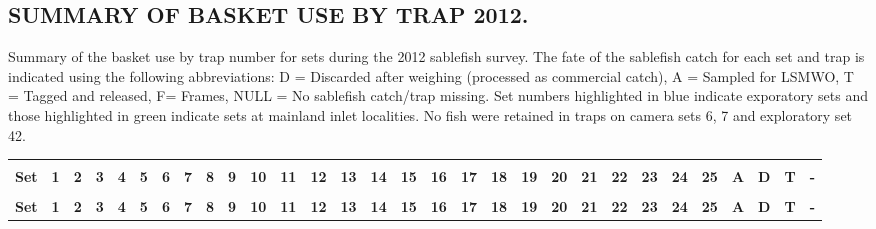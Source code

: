 \documentclass[12pt]{article}\usepackage[]{graphicx}\usepackage[]{color}
\begin{document}
\begin{appendices}
\section{SUMMARY OF BASKET USE BY TRAP 2012.}
\label{app:fifth-appendix}

Summary of the basket use by trap number for sets during the 2012 sablefish survey. The fate of the sablefish catch for each set and trap is indicated using the following abbreviations: D = Discarded after weighing (processed as commercial catch), A = Sampled for LSMWO, T = Tagged and released, F= Frames, NULL = No sablefish catch/trap missing. Set numbers highlighted in blue indicate exporatory sets and those highlighted in green indicate sets at mainland inlet localities. No fish were retained in traps on camera sets 6, 7 and exploratory set 42.
\begin{landscape}\begingroup\fontsize{7}{9}\selectfont
\begin{longtable}{>{\raggedright\arraybackslash}p{0.8cm}>{\raggedright\arraybackslash}p{0.2cm}>{\raggedright\arraybackslash}p{0.2cm}>{\raggedright\arraybackslash}p{0.2cm}>{\raggedright\arraybackslash}p{0.2cm}>{\raggedright\arraybackslash}p{0.2cm}>{\raggedright\arraybackslash}p{0.2cm}>{\raggedright\arraybackslash}p{0.2cm}>{\raggedright\arraybackslash}p{0.2cm}>{\raggedright\arraybackslash}p{0.2cm}>{\raggedright\arraybackslash}p{0.2cm}>{\raggedright\arraybackslash}p{0.2cm}>{\raggedright\arraybackslash}p{0.2cm}>{\raggedright\arraybackslash}p{0.2cm}>{\raggedright\arraybackslash}p{0.2cm}>{\raggedright\arraybackslash}p{0.2cm}>{\raggedright\arraybackslash}p{0.2cm}>{\raggedright\arraybackslash}p{0.2cm}>{\raggedright\arraybackslash}p{0.2cm}>{\raggedright\arraybackslash}p{0.2cm}>{\raggedright\arraybackslash}p{0.2cm}>{\raggedright\arraybackslash}p{0.2cm}>{\raggedright\arraybackslash}p{0.2cm}>{\raggedright\arraybackslash}p{0.2cm}>{\raggedright\arraybackslash}p{0.2cm}>{\raggedright\arraybackslash}p{0.2cm}>{\raggedleft\arraybackslash}p{0.2cm}>{\raggedleft\arraybackslash}p{0.2cm}rr}
\toprule
\multicolumn{1}{c}{\textbf{ }} & \multicolumn{25}{c}{\textbf{Trap}} & \multicolumn{4}{c}{\textbf{Total}} \\
\cmidrule(l{3pt}r{3pt}){2-26} \cmidrule(l{3pt}r{3pt}){27-30}
\textbf{Set} & \textbf{1} & \textbf{2} & \textbf{3} & \textbf{4} & \textbf{5} & \textbf{6} & \textbf{7} & \textbf{8} & \textbf{9} & \textbf{10} & \textbf{11} & \textbf{12} & \textbf{13} & \textbf{14} & \textbf{15} & \textbf{16} & \textbf{17} & \textbf{18} & \textbf{19} & \textbf{20} & \textbf{21} & \textbf{22} & \textbf{23} & \textbf{24} & \textbf{25} & \textbf{A} & \textbf{D} & \textbf{T} & \textbf{-}\\
\midrule
\endfirsthead
\multicolumn{30}{@{}l}{continued.}\\
\toprule
\textbf{Set} & \textbf{1} & \textbf{2} & \textbf{3} & \textbf{4} & \textbf{5} & \textbf{6} & \textbf{7} & \textbf{8} & \textbf{9} & \textbf{10} & \textbf{11} & \textbf{12} & \textbf{13} & \textbf{14} & \textbf{15} & \textbf{16} & \textbf{17} & \textbf{18} & \textbf{19} & \textbf{20} & \textbf{21} & \textbf{22} & \textbf{23} & \textbf{24} & \textbf{25} & \textbf{A} & \textbf{D} & \textbf{T} & \textbf{-}\\
\midrule
\endhead


\end{longtable}
\end{landscape}
\end{appendices}
\end{document}
